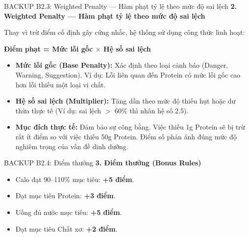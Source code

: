 \documentclass[10pt, aspectratio=169]{beamer}
\begin{document}
\begin{frame}[fragile, label=b2_3]{BACKUP B2.3: Weighted Penalty — Hàm phạt tỷ lệ theo mức độ sai lệch}
\hypertarget{b2_3_target}{}
    \textbf{2. Weighted Penalty — Hàm phạt tỷ lệ theo mức độ sai lệch}
    \vspace{0.1cm}
    
    Thay vì trừ điểm cố định gây cứng nhắc, hệ thống sử dụng công thức linh hoạt:
    
    \begin{center}
        \colorbox{NutriDark!10}{\textbf{Điểm phạt = Mức lỗi gốc $\times$ Hệ số sai lệch}}
    \end{center}
    
    \begin{itemize}
        \small
        \item \textbf{Mức lỗi gốc (Base Penalty):} Xác định theo loại cảnh báo (Danger, Warning, Suggestion). Ví dụ: Lỗi liên quan đến Protein có mức lỗi gốc cao hơn lỗi thiếu một loại vi chất.
        \item \textbf{Hệ số sai lệch (Multiplier):} Tăng dần theo mức độ thiếu hụt hoặc dư thừa thực tế (Ví dụ: sai lệch $>$ 60\% thì nhân hệ số 2.5).
        \item \textbf{Mục đích thực tế:} Đảm bảo sự công bằng. Việc thiếu 1g Protein sẽ bị trừ rất ít điểm so với việc thiếu 50g Protein. Điểm số phản ánh đúng mức độ nghiêm trọng của vấn đề dinh dưỡng.
    \end{itemize}
\end{frame}

\begin{frame}[t, label=b2_4]{BACKUP B2.4: Điểm thưởng}
\hypertarget{b2_4_target}{}
    \textbf{3. Điểm thưởng (Bonus Rules)}
    \begin{itemize}
        \item Calo đạt 90–110\% mục tiêu: \textbf{+5 điểm}.
        \item Đạt mục tiêu Protein: \textbf{+3 điểm}.
        \item Uống đủ nước mục tiêu: \textbf{+5 điểm}.
        \item Đạt mục tiêu Chất xơ: \textbf{+2 điểm}.
    \end{itemize}
\end{frame}
\end{document}
